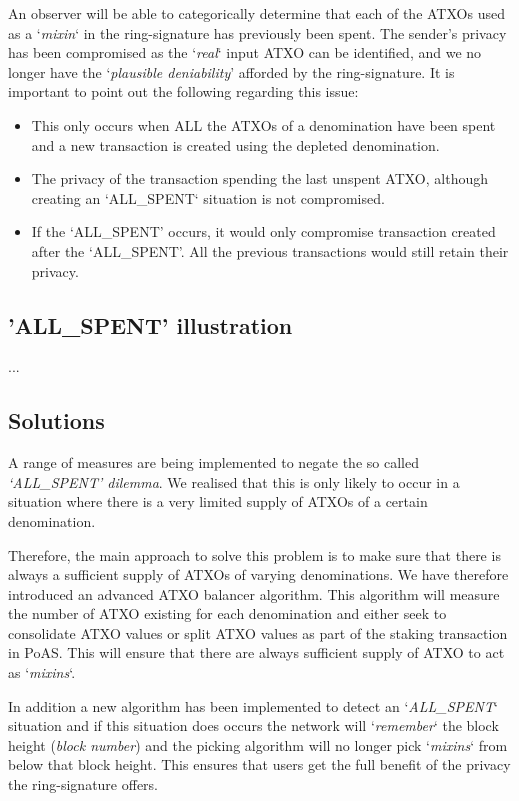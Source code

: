 An observer will be able to categorically determine that each of the ATXOs 
used as a ‘\textit{mixin}‘ in the ring-signature has previously been spent. 
The sender’s privacy has been compromised as the ‘\textit{real}‘ input ATXO 
can be identified, and we no longer have the ‘\textit{plausible deniability}’ 
afforded by the ring-signature. It is important to point out the following 
regarding this issue: 



\begin{itemize}
	\item This only occurs when ALL the ATXOs of a denomination have been 
	spent and a new transaction is created using the depleted denomination.
	\item The privacy of the transaction spending the last unspent ATXO, 
	although creating an ‘ALL\_SPENT‘ situation is not compromised.
	\item If the ‘ALL\_SPENT’ occurs, it would only compromise transaction 
	created after the ‘ALL\_SPENT’. All the previous transactions would still 
	retain their privacy.
\end{itemize}



\subsection{'ALL\_SPENT' illustration}

...

\subsection{Solutions}
A range of measures are being implemented to negate the so called 
\textit{‘ALL\_SPENT’ dilemma}. We realised that this is only likely 
to occur in a situation where there is a very limited supply of 
ATXOs of a certain denomination. 

Therefore, the main approach to solve this problem is to make sure that 
there is always a sufficient supply of ATXOs of varying denominations. 
We have therefore introduced an advanced ATXO balancer algorithm. This 
algorithm will measure the number of ATXO existing for each denomination 
and either seek to consolidate ATXO values or split ATXO values as part 
of the staking transaction in PoAS. This will ensure that there are 
always sufficient supply of ATXO to act as ‘\textit{mixins}‘. 



In addition a new algorithm has been implemented to detect an 
‘\textit{ALL\_SPENT}‘ situation and if this situation does occurs 
the network will ‘\textit{remember}‘ the block height (\textit{block number}) 
and the picking algorithm will no longer pick ‘\textit{mixins}‘ 
from below that block height. This ensures that users get the full 
benefit of the privacy the ring-signature offers. 



